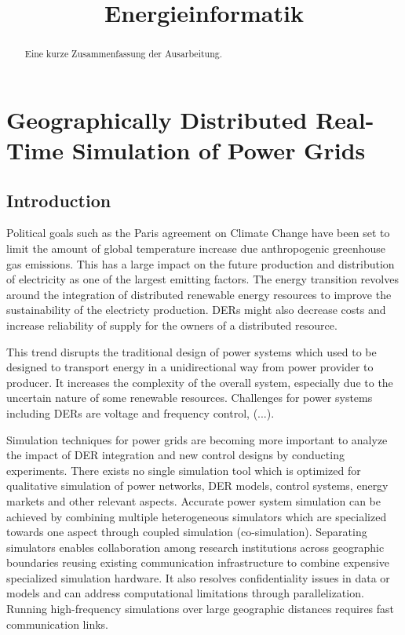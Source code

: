 \documentclass[a4paper,ngerman]{atseminar}
\title{Energieinformatik}
\author{}
\begin{document}
\maketitle

\GERMAN

\section{Geographically Distributed Real-Time Simulation of Power Grids}

\begin{abstract}
Eine kurze Zusammenfassung der Ausarbeitung. 
\end{abstract}

\subsection{Introduction}

Political goals such as the Paris agreement on Climate Change have been set to limit the amount of global temperature increase due anthropogenic greenhouse gas emissions. This has a large impact on the future production and distribution of electricity as one of the largest emitting factors. The energy transition revolves around the integration of distributed renewable energy resources to improve the sustainability of the electricty production. DERs might also decrease costs and increase
reliability of supply for the owners of a distributed resource. 

This trend disrupts the traditional design of power systems which used to be designed to transport energy in a unidirectional way from power provider to producer. It increases the complexity of the overall system, especially due to the uncertain nature of some renewable resources. Challenges for power systems including DERs are voltage and frequency control, (...). 

Simulation techniques for power grids are becoming more important to analyze the impact of DER integration and new control designs by conducting experiments. There exists no single simulation tool which is optimized for qualitative simulation of power networks, DER models, control systems, energy markets and other relevant aspects. Accurate power system simulation can be achieved by combining multiple heterogeneous simulators which are specialized towards one aspect through
coupled simulation (co-simulation).
Separating simulators enables collaboration among research institutions across geographic boundaries reusing existing communication infrastructure to combine expensive specialized simulation hardware. It also resolves confidentiality issues in data or models and can address computational limitations through parallelization. Running high-frequency simulations over large geographic distances requires fast communication links. 
\end{document}
